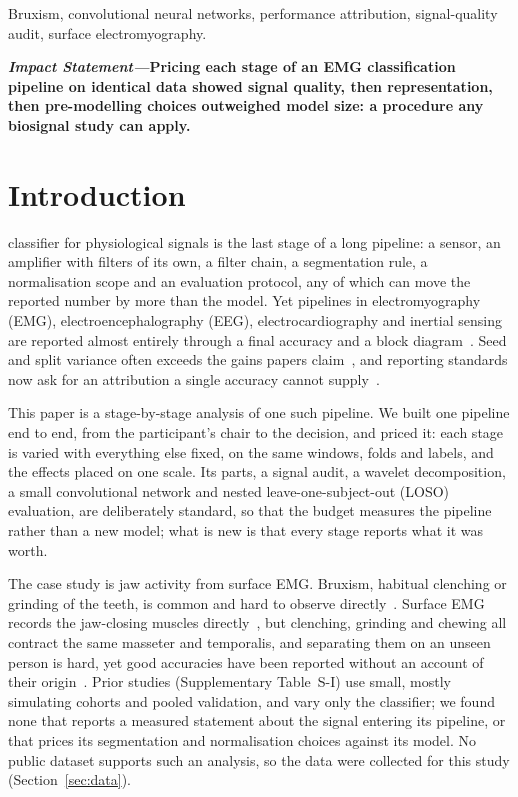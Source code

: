 \documentclass[journal]{IEEEtran}
\begin{document}
\begin{IEEEkeywords}
Bruxism, convolutional neural networks, performance attribution, signal-quality audit, surface electromyography.
\end{IEEEkeywords}

\IEEEpeerreviewmaketitle

\textbf{\textit{Impact Statement---}Pricing each stage of an EMG classification pipeline on identical data showed signal quality, then representation, then pre-modelling choices outweighed model size: a procedure any biosignal study can apply.}\\

\section{Introduction}

 classifier for physiological signals is the last stage of a long pipeline: a sensor, an amplifier with filters of its own, a filter chain, a segmentation rule, a normalisation scope and an evaluation protocol, any of which can move the reported number by more than the model. Yet pipelines in electromyography (EMG), electroencephalography (EEG), electrocardiography and inertial sensing are reported almost entirely through a final accuracy and a block diagram~\cite{thymi2021signal,roy2019deep}. Seed and split variance often exceeds the gains papers claim~\cite{bouthillier2021accounting}, and reporting standards now ask for an attribution a single accuracy cannot supply~\cite{kapoor2024reforms,collins2024tripod}.

This paper is a stage-by-stage analysis of one such pipeline. We built one pipeline end to end, from the participant's chair to the decision, and priced it: each stage is varied with everything else fixed, on the same windows, folds and labels, and the effects placed on one scale. Its parts, a signal audit, a wavelet decomposition, a small convolutional network and nested leave-one-subject-out (LOSO) evaluation, are deliberately standard, so that the budget measures the pipeline rather than a new model; what is new is that every stage reports what it was worth.

The case study is jaw activity from surface EMG. Bruxism, habitual clenching or grinding of the teeth, is common and hard to observe directly~\cite{lavigne2008bruxism,lavigne1996sleep}. Surface EMG records the jaw-closing muscles directly~\cite{raez2006techniques,colonna2023electromyographic}, but clenching, grinding and chewing all contract the same masseter and temporalis, and separating them on an unseen person is hard, yet good accuracies have been reported without an account of their origin~\cite{sonmezocak2021detection,gul2024advanced,ishtiaq2025wearable,heyat2020computational}. Prior studies (Supplementary Table~S-I) use small, mostly simulating cohorts and pooled validation, and vary only the classifier; we found none that reports a measured statement about the signal entering its pipeline, or that prices its segmentation and normalisation choices against its model. No public dataset supports such an analysis, so the data were collected for this study (Section~\ref{sec:data}).
\end{document}
